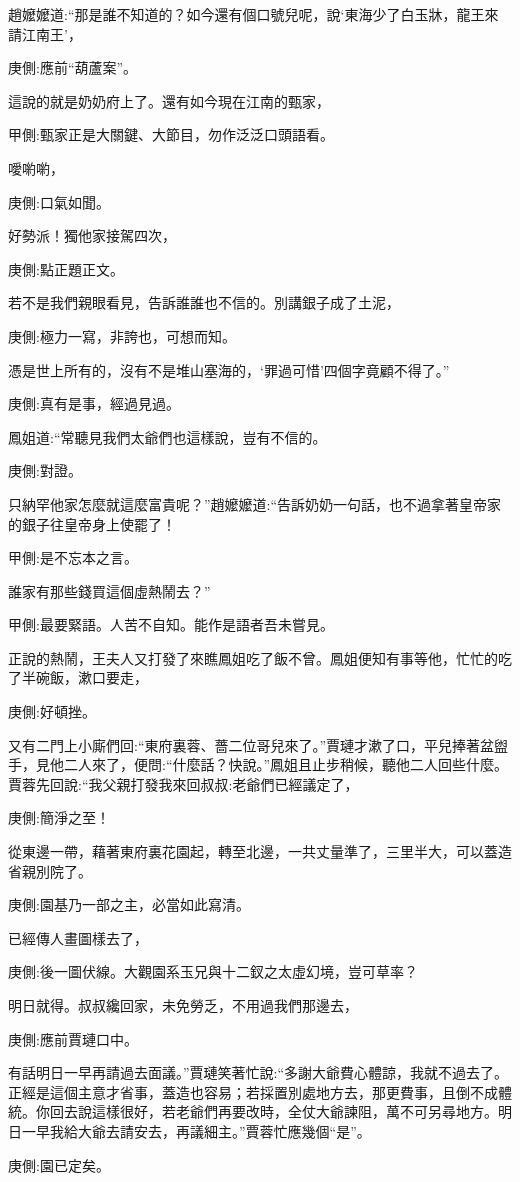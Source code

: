 \begin{parag}
    趙嬤嬤道:“那是誰不知道的？如今還有個口號兒呢，說‘東海少了白玉牀，龍王來請江南王’，\begin{note}庚側:應前“葫蘆案”。\end{note}這說的就是奶奶府上了。還有如今現在江南的甄家，\begin{note}甲側:甄家正是大關鍵、大節目，勿作泛泛口頭語看。\end{note}噯喲喲，\begin{note}庚側:口氣如聞。\end{note}好勢派！獨他家接駕四次，\begin{note}庚側:點正題正文。\end{note}若不是我們親眼看見，告訴誰誰也不信的。別講銀子成了土泥，\begin{note}庚側:極力一寫，非誇也，可想而知。\end{note}憑是世上所有的，沒有不是堆山塞海的，‘罪過可惜’四個字竟顧不得了。”\begin{note}庚側:真有是事，經過見過。\end{note}鳳姐道:“常聽見我們太爺們也這樣說，豈有不信的。\begin{note}庚側:對證。\end{note}只納罕他家怎麼就這麼富貴呢？”趙嬤嬤道:“告訴奶奶一句話，也不過拿著皇帝家的銀子往皇帝身上使罷了！\begin{note}甲側:是不忘本之言。\end{note}誰家有那些錢買這個虛熱鬧去？”\begin{note}甲側:最要緊語。人苦不自知。能作是語者吾未嘗見。\end{note}
\end{parag}


\begin{parag}
    正說的熱鬧，王夫人又打發了來瞧鳳姐吃了飯不曾。鳳姐便知有事等他，忙忙的吃了半碗飯，漱口要走，\begin{note}庚側:好頓挫。\end{note}又有二門上小廝們回:“東府裏蓉、薔二位哥兒來了。”賈璉才漱了口，平兒捧著盆盥手，見他二人來了，便問:“什麼話？快說。”鳳姐且止步稍候，聽他二人回些什麼。賈蓉先回說:“我父親打發我來回叔叔:老爺們已經議定了，\begin{note}庚側:簡淨之至！\end{note}從東邊一帶，藉著東府裏花園起，轉至北邊，一共丈量準了，三里半大，可以蓋造省親別院了。\begin{note}庚側:園基乃一部之主，必當如此寫清。\end{note}已經傳人畫圖樣去了，\begin{note}庚側:後一圖伏線。大觀園系玉兄與十二釵之太虛幻境，豈可草率？\end{note}明日就得。叔叔纔回家，未免勞乏，不用過我們那邊去，\begin{note}庚側:應前賈璉口中。\end{note}有話明日一早再請過去面議。”賈璉笑著忙說:“多謝大爺費心體諒，我就不過去了。正經是這個主意才省事，蓋造也容易；若採置別處地方去，那更費事，且倒不成體統。你回去說這樣很好，若老爺們再要改時，全仗大爺諫阻，萬不可另尋地方。明日一早我給大爺去請安去，再議細主。”賈蓉忙應幾個“是”。\begin{note}庚側:園已定矣。\end{note}
\end{parag}


